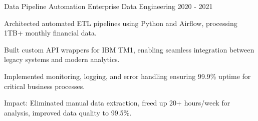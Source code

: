 \begin{cventries}
\cventry
  {Data Pipeline Automation} %
  {Enterprise Data Engineering} %
  {} %
  {2020 - 2021} %
  {
    \begin{cvitems} %
      \item {Architected automated ETL pipelines using Python and Airflow, processing 1TB+ monthly financial data.}
      \item {Built custom API wrappers for IBM TM1, enabling seamless integration between legacy systems and modern analytics.}
      \item {Implemented monitoring, logging, and error handling ensuring 99.9\% uptime for critical business processes.}
      \item {Impact: Eliminated manual data extraction, freed up 20+ hours/week for analysis, improved data quality to 99.5\%.}
    \end{cvitems} 
  }

\end{cventries}
